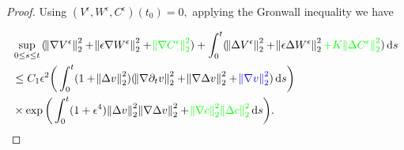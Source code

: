 \documentclass[11pt]{article}
\newcommand*\diff{\mathop{}\!\mathrm{d}}
\begin{document}
\begin{proof}
Using $(V^\epsilon, W^\epsilon, C^\epsilon)(t_0) = 0,$ applying the Gronwall inequality we have 

\begin{equation} \label{result_theorem1}
  \begin{split}
    & \sup_{0 \leq s \leq t}{(\norm{\nabla V^\epsilon}^2_2 + \norm{\epsilon \nabla W^\epsilon}^2_2 + \textcolor{green}{\norm{\nabla C^\epsilon}^2_2}) } + \int_0^t (\norm{\Delta V^\epsilon}^2_2 + \norm{\epsilon \Delta W^\epsilon}^2_2 \textcolor{green}{+ K \norm{\Delta C^\epsilon}^2_2}) \diff s \\
    & \leq C_1 \epsilon^2 \bigg ( \int_0^t (1 + \norm{\Delta v}^2_2) (\norm{\nabla \partial_t v}^2_2 + \norm{\nabla \Delta v}^2_2 + \textcolor{blue}{\norm{\nabla v}_2^2}) \diff s \bigg ) \\
    & \times \exp{ \bigg (\int_0^t (1+ \epsilon^4) \norm{\Delta v}^2_2 \norm{\nabla \Delta v}^2_2 + \textcolor{green}{\norm{\nabla c}^2_2 \norm{\Delta c}^2_2} \diff s \bigg ) }.
  \end{split}
\end{equation}

\end{proof}
\end{document}
